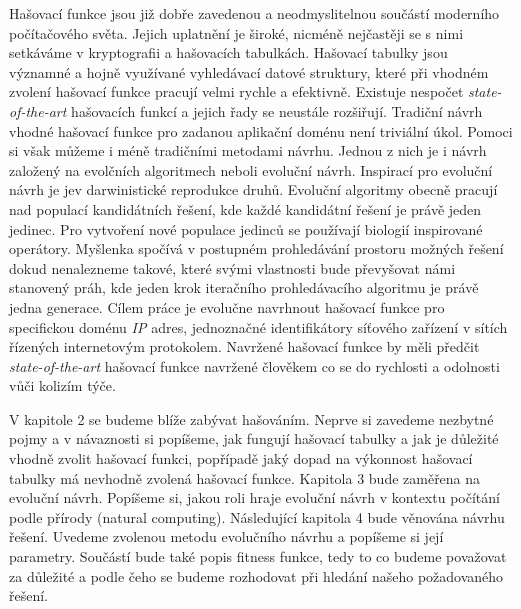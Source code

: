 


Hašovací 
funkce jsou již dobře zavedenou a neodmyslitelnou součástí moderního
počítačového světa. Jejich uplatnění je široké, nicméně nejčastěji se s
nimi setkáváme v kryptografii a hašovacích tabulkách. Hašovací
tabulky jsou významné a hojně využívané vyhledávací datové struktury, 
které při vhodném zvolení hašovací funkce pracují velmi rychle a 
efektivně. Existuje nespočet \textit{state-of-the-art} hašovacích funkcí a
jejich řady se neustále rozšiřují.
Tradiční návrh vhodné hašovací funkce pro zadanou aplikační 
doménu není triviální úkol. Pomoci si však můžeme i méně tradičními 
metodami návrhu. Jednou z nich je i návrh založený na evolčních 
algoritmech neboli evoluční návrh. Inspirací pro evoluční návrh je jev 
darwinistické reprodukce druhů. Evoluční algoritmy obecně pracují nad populací 
kandidátních řešení, kde každé kandidátní řešení je právě jeden jedinec. 
Pro vytvoření nové populace jedinců se používají 
biologií inspirované operátory. Myšlenka spočívá v postupném prohledávání 
prostoru možných řešení dokud nenalezneme takové, které svými vlastnosti 
bude převyšovat námi stanovený práh, kde jeden krok iteračního 
prohledávacího algoritmu je právě jedna generace. Cílem práce je evolučne navrhnout
hašovací funkce pro specifickou doménu \textit{IP} adres, jednoznačné identifikátory
síťového zařízení v sítích řízených internetovým protokolem. Navržené hašovací
funkce by měli předčit \textit{state-of-the-art} hašovací funkce navržené člověkem
co se do rychlosti a odolnosti vůči kolizím týče.

V kapitole 2 se budeme blíže zabývat hašováním. Neprve si zavedeme 
nezbytné pojmy a v návaznosti si popíšeme, jak fungují hašovací tabulky a 
jak je důležité vhodně zvolit hašovací funkci, popřípadě jaký dopad na 
výkonnost hašovací tabulky má nevhodně zvolená hašovací funkce.
Kapitola 3 bude zaměřena na evoluční návrh. Popíšeme si, jakou roli hraje
evoluční návrh v kontextu počítání podle přírody (natural computing).
Následující kapitola 4 bude věnována návrhu řešení. Uvedeme 
zvolenou metodu evolučního návrhu a popíšeme si její parametry. Součástí 
bude také popis fitness funkce, tedy to co budeme považovat za důležité a 
podle čeho se budeme rozhodovat při hledání našeho požadovaného řešení.
